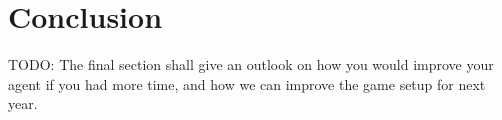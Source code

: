 \section{Conclusion} \label{conclusion}

TODO: The final section shall give an outlook on how you would improve your agent if you had more time, and how we can improve the game setup for next year.